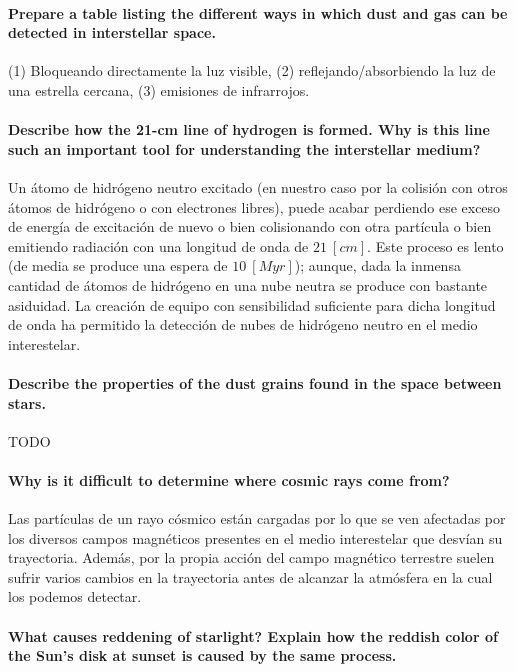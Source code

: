 \documentclass{tufte-handout}
\begin{document}
\paragraph{\textbf{Prepare a table listing the different ways in which dust and gas can be detected in interstellar space.}}

(1) Bloqueando directamente la luz visible, (2) reflejando/absorbiendo la luz de una estrella cercana, (3) emisiones de infrarrojos.

\paragraph{\textbf{Describe how the 21-cm line of hydrogen is formed. Why is this line such an important tool for
understanding the interstellar medium?}}

Un átomo de hidrógeno neutro excitado (en nuestro caso por la colisión con otros átomos de hidrógeno o con electrones libres), puede acabar perdiendo ese exceso de energía de excitación de nuevo o bien colisionando con otra partícula o bien emitiendo radiación con una longitud de onda de $21~[cm]$. Este proceso es lento (de media se produce una espera de $10~[Myr]$); aunque, dada la inmensa cantidad de átomos de hidrógeno en una nube neutra se produce con bastante asiduidad. La creación de equipo con sensibilidad suficiente para dicha longitud de onda ha permitido la detección de nubes de hidrógeno neutro en el medio interestelar.

\paragraph{\textbf{Describe the properties of the dust grains found in the space between stars.}}

TODO

\paragraph{\textbf{Why is it difficult to determine where cosmic rays come from?}}

Las partículas de un rayo cósmico están cargadas por lo que se ven afectadas por los diversos campos magnéticos presentes en el medio interestelar que desvían su trayectoria. Además, por la propia acción del campo magnético terrestre suelen sufrir varios cambios en la trayectoria antes de alcanzar la atmósfera en la cual los podemos detectar.

\paragraph{\textbf{What causes reddening of starlight? Explain how the reddish color of the Sun’s disk at sunset is caused by
the same process.}}
\end{document}
